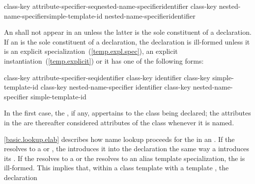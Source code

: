 \begin{bnf}
\br
    class-key attribute-specifier-seq\opt nested-name-specifier\opt identifier\br
    class-key nested-name-specifier\opt {}\opt simple-template-id\br
     nested-name-specifier\opt identifier
\end{bnf}

\pnum
{}%
%
An  shall not appear in an 
unless the latter is the sole constituent of a declaration.
If an  is the sole constituent of a
declaration, the declaration is ill-formed unless it is an explicit
specialization~(\ref{temp.expl.spec}), an explicit
instantiation~(\ref{temp.explicit}) or it has one of the following
forms:

\begin{ncsimplebnf}
class-key attribute-specifier-seq\opt identifier \terminal{;}\br
{} class-key \terminal{::\opt} identifier \terminal{;}\br
{} class-key \terminal{::\opt} simple-template-id \terminal{;}\br
{} class-key nested-name-specifier identifier \terminal{;}\br
{} class-key nested-name-specifier  simple-template-id \terminal{;}
\end{ncsimplebnf}

In the first case, the , if any, appertains
to the class being declared; the attributes in the
 are thereafter considered attributes of
the class whenever it is named.

\pnum
\ref{basic.lookup.elab} describes how name lookup proceeds for the
 in an . If the
 resolves to a  or
, the 
introduces it into the declaration the same way a
 introduces its . If
the  resolves to a
 or the  resolves to
an alias template specialization,
the
 is ill-formed.
\enternote
This implies that, within a class template with a template
 , the declaration

